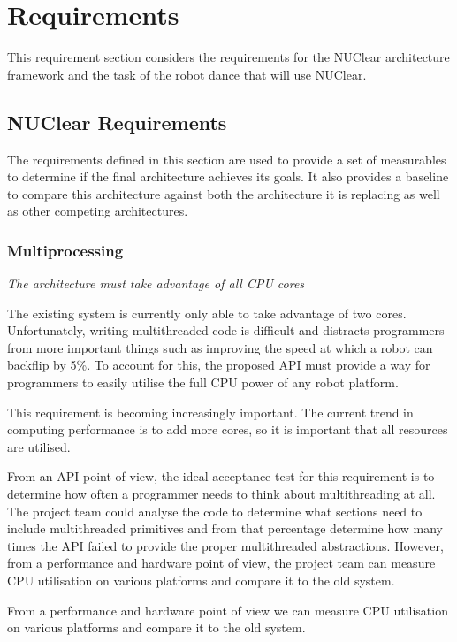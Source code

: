 \documentclass[english,12pt]{scrartcl}
\newcommand{\requirement}[1]{\textit{#1}}
\begin{document}
	\section{Requirements}
	This requirement section considers the requirements for the NUClear architecture framework and the task of the robot dance that will use NUClear.

		\subsection{NUClear Requirements}
			The requirements defined in this section are used to provide a set of measurables to determine if the final architecture achieves its goals.
			It also provides a baseline to compare this architecture against both the architecture it is replacing as well as other competing architectures.

			\subsubsection{Multiprocessing}
				\requirement{The architecture must take advantage of all CPU cores}

				The existing system is currently only able to take advantage of two cores.
				Unfortunately, writing multithreaded code is difficult and distracts programmers from more important things such as improving the speed at which a robot can backflip by 5\%.
				To account for this, the proposed API must provide a way for programmers to easily utilise the full CPU power of any robot platform.

				This requirement is becoming increasingly important.
				The current trend in computing performance is to add more cores, so it is important that all resources are utilised.

				From an API point of view, the ideal acceptance test for this requirement is to determine how often a programmer needs to think about multithreading at all.
				The project team could analyse the code to determine what sections need to include multithreaded primitives and from that percentage determine how many times the API failed to provide the proper multithreaded abstractions.
				However, from a performance and hardware point of view, the project team can measure CPU utilisation on various platforms and compare it to the old system.

				From a performance and hardware point of view we can measure CPU utilisation on various
				platforms and compare it to the old system.
\end{document}
